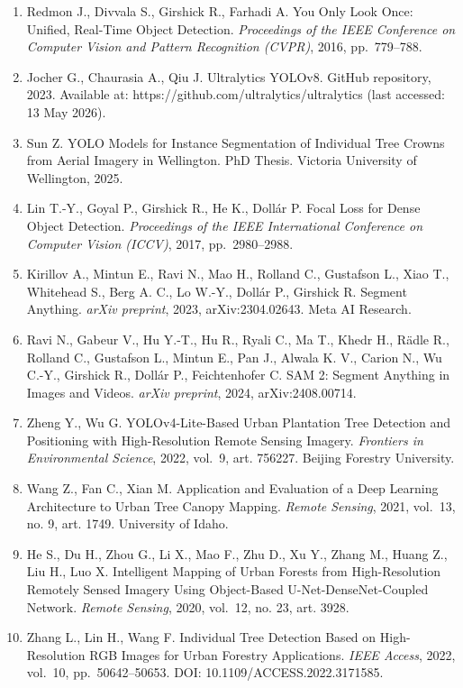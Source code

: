 \begin{enumerate}
\item
  Redmon J., Divvala S., Girshick R., Farhadi A. You Only Look Once: Unified, Real-Time Object Detection. \emph{Proceedings of the IEEE Conference on Computer Vision and Pattern Recognition (CVPR)}, 2016, pp.~779--788.
\item
  Jocher G., Chaurasia A., Qiu J. Ultralytics YOLOv8. GitHub repository, 2023. Available at: https://github.com/ultralytics/ultralytics (last accessed: 13 May 2026).
\item
  Sun Z. YOLO Models for Instance Segmentation of Individual Tree Crowns from Aerial Imagery in Wellington. PhD Thesis. Victoria University of Wellington, 2025.
\item
  Lin T.-Y., Goyal P., Girshick R., He K., Dollár P. Focal Loss for Dense Object Detection. \emph{Proceedings of the IEEE International Conference on Computer Vision (ICCV)}, 2017, pp.~2980--2988.
\item
  Kirillov A., Mintun E., Ravi N., Mao H., Rolland C., Gustafson L., Xiao T., Whitehead S., Berg A. C., Lo W.-Y., Dollár P., Girshick R. Segment Anything. \emph{arXiv preprint}, 2023, arXiv:2304.02643. Meta AI Research.
\item
  Ravi N., Gabeur V., Hu Y.-T., Hu R., Ryali C., Ma T., Khedr H., Rädle R., Rolland C., Gustafson L., Mintun E., Pan J., Alwala K. V., Carion N., Wu C.-Y., Girshick R., Dollár P., Feichtenhofer C. SAM 2: Segment Anything in Images and Videos. \emph{arXiv preprint}, 2024, arXiv:2408.00714.
\item
  Zheng Y., Wu G. YOLOv4-Lite-Based Urban Plantation Tree Detection and Positioning with High-Resolution Remote Sensing Imagery. \emph{Frontiers in Environmental Science}, 2022, vol.~9, art. 756227. Beijing Forestry University.
\item
  Wang Z., Fan C., Xian M. Application and Evaluation of a Deep Learning Architecture to Urban Tree Canopy Mapping. \emph{Remote Sensing}, 2021, vol.~13, no. 9, art. 1749. University of Idaho.
\item
  He S., Du H., Zhou G., Li X., Mao F., Zhu D., Xu Y., Zhang M., Huang Z., Liu H., Luo X. Intelligent Mapping of Urban Forests from High-Resolution Remotely Sensed Imagery Using Object-Based U-Net-DenseNet-Coupled Network. \emph{Remote Sensing}, 2020, vol.~12, no. 23, art. 3928.
\item
  Zhang L., Lin H., Wang F. Individual Tree Detection Based on High-Resolution RGB Images for Urban Forestry Applications. \emph{IEEE Access}, 2022, vol.~10, pp.~50642--50653. DOI: 10.1109/ACCESS.2022.3171585.

\end{enumerate}
